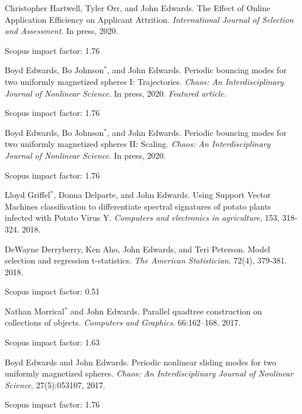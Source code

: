 \documentclass[margin,line]{res}
\newcommand{\pubunder}[1]{#1}
\begin{document}
\begin{resume}
Christopher Hartwell, Tyler Orr, and \pubunder{John Edwards}. The Effect of Online Application Efficiency on Applicant Attrition. \textit{International Journal of Selection and Assessment}. In press, 2020.
\begin{IMPACT}
Scopus impact factor: 1.76 %
\end{IMPACT}

Boyd Edwards, Bo Johnson$^*$, and \pubunder{John Edwards}. Periodic bouncing modes for two uniformly magnetized spheres I: Trajectories. \textit{Chaos: An Interdisciplinary Journal of Nonlinear Science}. In press, 2020. \textit{Featured article.}
\begin{IMPACT}
Scopus impact factor: 1.76 %
\end{IMPACT}

Boyd Edwards, Bo Johnson$^*$, and \pubunder{John Edwards}. Periodic bouncing modes for two uniformly magnetized spheres II: Scaling. \textit{Chaos: An Interdisciplinary Journal of Nonlinear Science}. In press, 2020.
\begin{IMPACT}
Scopus impact factor: 1.76 %
\end{IMPACT}

Lloyd Griffel$^*$, Donna Delparte, and John Edwards. Using Support Vector Machines classification to differentiate spectral signatures of potato plants infected with Potato Virus Y. \textit{Computers and electronics in agriculture}, 153, 318-324. 2018.

DeWayne Derryberry, Ken Aho, \pubunder{John Edwards}, and Teri Peterson. Model selection and regression t-statistics. \textit{The American Statistician}. 72(4), 379-381. 2018.
\begin{IMPACT}
Scopus impact factor: 0.51 %
\end{IMPACT}

Nathan Morrical$^*$ and \pubunder{John Edwards}. Parallel quadtree construction on collections of objects. \textit{Computers and Graphics}. 66:162–168. 2017.
\begin{IMPACT}
Scopus impact factor: 1.63 %
\end{IMPACT}

Boyd Edwards and \pubunder{John Edwards}. Periodic nonlinear sliding modes for two uniformly magnetized spheres. \textit{Chaos: An Interdisciplinary Journal of Nonlinear Science}. 27(5):053107, 2017.
\begin{IMPACT}
Scopus impact factor: 1.76 %
\end{IMPACT}


\end{resume}
\end{document}
